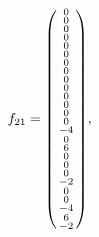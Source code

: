 \documentclass[fleqn]{article}
\begin{document}
\begin{subequations}
    \begin{equation}
        f_{21} = \spmqty{  0 \\  0 \\  0 \\ 0 \\  0 \\  0 \\  0 \\ 0 \\ 0 \\  0 \\  0 \\  0 \\  0 \\  0 \\ -4 \\ 0 \\ 6 \\  0 \\  0 \\  0 \\ -2 \\  0 \\  0 \\ -4 \\ 6 \\ -2 },~

\end{equation}
\end{subequations}
\end{document}
